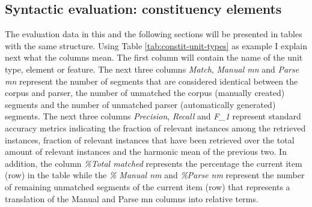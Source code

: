 \subsection{Syntactic evaluation: constituency elements}
\label{sec:syntactic-constituents}
The evaluation data in this and the following sections will be presented in tables with the same structure. Using Table \ref{tab:constit-unit-types} as example I explain next what the columns mean. The first column will contain the name of the unit type, element or feature. The next three columns \textit{Match}, \textit{Manual mn} and \textit{Parse mn} represent the number of segments that are considered identical between the corpus and parser, the number of unmatched the corpus (manually created) segments and the number of unmatched parser (automatically generated) segments. The next three columns \textit{Precision}, \textit{Recall} and \textit{F_1} represent standard accuracy metrics indicating the fraction of relevant instances among the retrieved instances, fraction of relevant instances that have been retrieved over the total amount of relevant instances and the harmonic mean of the previous two. In addition, the column \textit{\%Total matched} represents the percentage the current item (row) in the table while the \textit{\% Manual nm} and \textit{\%Parse nm} represent the number of remaining unmatched segments of the current item (row) that represents a translation of the Manual and Parse mn columns into relative terms. 

